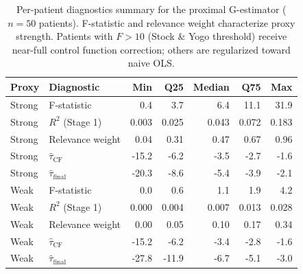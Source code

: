 \begin{table}[htbp]
\centering
\caption{Per-patient diagnostics summary for the proximal G-estimator ($n=50$ patients). F-statistic and relevance weight characterize proxy strength. Patients with $F > 10$ (Stock \& Yogo threshold) receive near-full control function correction; others are regularized toward naive OLS.}
\label{tab:diagnostics}
\begin{tabular}{llrrrrr}
\toprule
Proxy & Diagnostic & Min & Q25 & Median & Q75 & Max \\
\midrule
Strong & F-statistic & 0.4 & 3.7 & 6.4 & 11.1 & 31.9 \\
Strong & $R^2$ (Stage 1) & 0.003 & 0.025 & 0.043 & 0.072 & 0.183 \\
Strong & Relevance weight & 0.04 & 0.31 & 0.47 & 0.67 & 0.96 \\
Strong & $\hat{\tau}_{\mathrm{CF}}$ & -15.2 & -6.2 & -3.5 & -2.7 & -1.6 \\
Strong & $\hat{\tau}_{\mathrm{final}}$ & -20.3 & -8.6 & -5.4 & -3.9 & -2.1 \\
\midrule
Weak & F-statistic & 0.0 & 0.6 & 1.1 & 1.9 & 4.2 \\
Weak & $R^2$ (Stage 1) & 0.000 & 0.004 & 0.007 & 0.013 & 0.028 \\
Weak & Relevance weight & 0.00 & 0.05 & 0.10 & 0.17 & 0.34 \\
Weak & $\hat{\tau}_{\mathrm{CF}}$ & -15.2 & -6.2 & -3.4 & -2.8 & -1.6 \\
Weak & $\hat{\tau}_{\mathrm{final}}$ & -27.8 & -11.9 & -6.7 & -5.1 & -3.0 \\
\bottomrule
\end{tabular}
\end{table}
